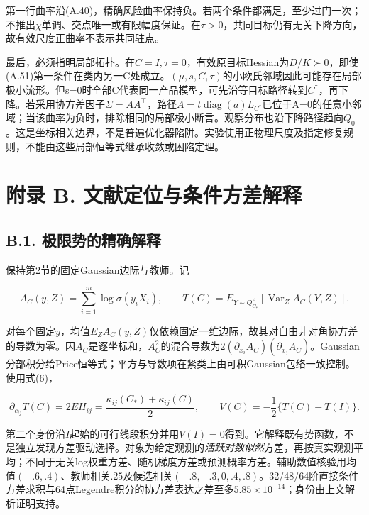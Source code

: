 \documentclass[11pt,a4paper]{article}
\begin{document}
第一行曲率沿(A.40)，精确风险曲率保持负。若两个条件都满足，至少过门一次；不推出\(\chi\)单调、交点唯一或有限幅度保证。在\(\tau>0\)，共同目标仍有无关下降方向，故有效尺度正曲率不表示共同驻点。

最后，必须指明局部拓扑。在\(C=I,\tau=0\)，有效原目标Hessian为\(D/K\succ0\)，即使(A.51)第一条件在类内另一C处成立。\((\mu,s,C,\tau)\)的小欧氏邻域因此可能存在局部极小流形。但s=0时全部C代表同一产品模型，可先沿等目标路径转到\(C^\dagger\)，再下降。若采用协方差因子\(\Sigma=AA^\top\)，路径\(A=t\operatorname{diag}(a)L_{C^\dagger}\)已位于A=0的任意小邻域；当该曲率为负时，排除相同的局部极小断言。观察分布也沿下降路径趋向\(Q_0\)。这是坐标相关边界，不是普遍优化器陷阱。实验使用正物理尺度及指定修复规则，不能由这些局部恒等式继承收敛或困陷定理。

\clearpage

\section*{附录 B.
文献定位与条件方差解释}\label{ux9644ux5f55-b.-ux6587ux732eux5b9aux4f4dux4e0eux6761ux4ef6ux65b9ux5deeux89e3ux91ca}

\subsection*{B.1.
极限势的精确解释}\label{b.1.-ux6781ux9650ux52bfux7684ux7cbeux786eux89e3ux91ca}

保持第2节的固定Gaussian边际与教师。记

\[
A_C(y,Z)=\sum_{i=1}^m\log\sigma(y_iX_i),\qquad
T(C)=E_{Y\sim Q_{C_*}^A}\!\left[\operatorname{Var}_Z A_C(Y,Z)\right].
\tag{B.1}
\]

对每个固定\(y\)，均值\(E_ZA_C(y,Z)\)仅依赖固定一维边际，故其对自由非对角协方差的导数为零。因\(A_C\)是逐坐标和，\(A_C^2\)的混合导数为\(2(\partial_{x_i}A_C)(\partial_{x_j}A_C)\)。Gaussian分部积分给Price恒等式\citep{price1958}；平方与导数项在紧类上由可积Gaussian包络一致控制。使用式(6)，

\[
\partial_{c_{ij}}T(C)=2EH_{ij}
=\frac{\kappa_{ij}(C_*)+\kappa_{ij}(C)}2,
\qquad V(C)=-\frac12\{T(C)-T(I)\}.
\tag{B.2}
\]

第二个身份沿\(I\)起始的可行线段积分并用\(V(I)=0\)得到。它解释既有势函数，不是独立发现方差驱动选择。对象为给定观测的\emph{活跃对数似然}方差，再按真实观测平均；不同于无关log权重方差、随机梯度方差或预测概率方差。辅助数值核验用均值\((-.6,.4)\)、教师相关\(.25\)及候选相关\((-.8,-.3,0,.4,.8)\)。32/48/64阶直接条件方差求积与64点Legendre积分的协方差表达之差至多\(5.85\times10^{-14}\)；身份由上文解析证明支持。
\end{document}
